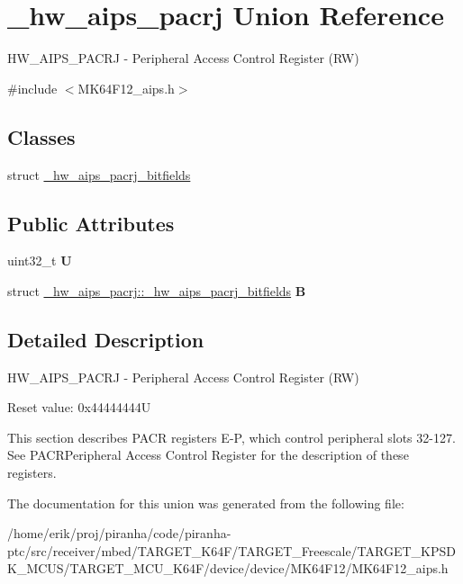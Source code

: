 \hypertarget{union__hw__aips__pacrj}{}\section{\+\_\+hw\+\_\+aips\+\_\+pacrj Union Reference}
\label{union__hw__aips__pacrj}


H\+W\+\_\+\+A\+I\+P\+S\+\_\+\+P\+A\+C\+RJ -\/ Peripheral Access Control Register (RW)  




{\ttfamily \#include $<$M\+K64\+F12\+\_\+aips.\+h$>$}

\subsection*{Classes}
\begin{DoxyCompactItemize}
\item 
struct \hyperlink{struct__hw__aips__pacrj_1_1__hw__aips__pacrj__bitfields}{\+\_\+hw\+\_\+aips\+\_\+pacrj\+\_\+bitfields}
\end{DoxyCompactItemize}
\subsection*{Public Attributes}
\begin{DoxyCompactItemize}
\item 
uint32\+\_\+t {\bfseries U}\hypertarget{union__hw__aips__pacrj_a8ef4a4b799c2531b3e3c4cd306bcdd04}{}\label{union__hw__aips__pacrj_a8ef4a4b799c2531b3e3c4cd306bcdd04}

\item 
struct \hyperlink{struct__hw__aips__pacrj_1_1__hw__aips__pacrj__bitfields}{\+\_\+hw\+\_\+aips\+\_\+pacrj\+::\+\_\+hw\+\_\+aips\+\_\+pacrj\+\_\+bitfields} {\bfseries B}\hypertarget{union__hw__aips__pacrj_ad80b01030d85ee906c4ab96403f0384f}{}\label{union__hw__aips__pacrj_ad80b01030d85ee906c4ab96403f0384f}

\end{DoxyCompactItemize}


\subsection{Detailed Description}
H\+W\+\_\+\+A\+I\+P\+S\+\_\+\+P\+A\+C\+RJ -\/ Peripheral Access Control Register (RW) 

Reset value\+: 0x44444444U

This section describes P\+A\+CR registers E-\/P, which control peripheral slots 32-\/127. See P\+A\+C\+R\+Peripheral Access Control Register for the description of these registers. 

The documentation for this union was generated from the following file\+:\begin{DoxyCompactItemize}
\item 
/home/erik/proj/piranha/code/piranha-\/ptc/src/receiver/mbed/\+T\+A\+R\+G\+E\+T\+\_\+\+K64\+F/\+T\+A\+R\+G\+E\+T\+\_\+\+Freescale/\+T\+A\+R\+G\+E\+T\+\_\+\+K\+P\+S\+D\+K\+\_\+\+M\+C\+U\+S/\+T\+A\+R\+G\+E\+T\+\_\+\+M\+C\+U\+\_\+\+K64\+F/device/device/\+M\+K64\+F12/M\+K64\+F12\+\_\+aips.\+h\end{DoxyCompactItemize}
